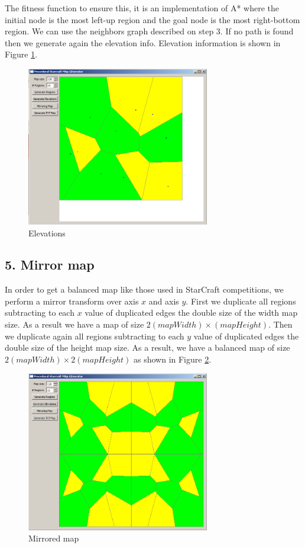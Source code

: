 \documentclass[letterpaper]{article}
\begin{document}
The fitness function to ensure this, it is an implementation of A* where the initial node is the most left-up region and the goal node is the most right-bottom region. We can use the neighbors graph described on step 3. If no path is found then we generate again the elevation info. Elevation information is shown in Figure \ref{fig:elevations}.

\begin{figure}[ht]
    \centering
    \includegraphics[width=8cm]{PCG03.png}
    \caption{Elevations}
    \label{fig:elevations}
\end{figure}

\subsection{5. Mirror map}
In order to get a balanced map like those used in StarCraft competitions, we perform a mirror transform over axis $x$ and axis $y$. First we duplicate all regions subtracting to each $x$ value of duplicated edges the double size of the width map size. As a result we have a map of size $2(mapWidth) \times (mapHeight)$. Then we duplicate again all regions subtracting to each $y$ value of duplicated edges the double size of the height map size. As a result, we have a balanced map of size $2(mapWidth)  \times 2(mapHeight)$ as shown in Figure \ref{fig:mirrored-map}.

\begin{figure}[ht]
    \centering
    \includegraphics[width=8cm]{PCG04.png}
    \caption{Mirrored map}
    \label{fig:mirrored-map}
\end{figure}
\end{document}
